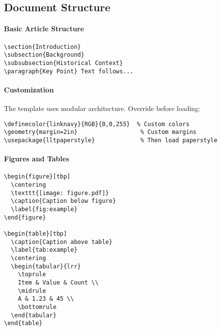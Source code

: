 \documentclass[11pt]{article}
\begin{document}
\subsection{Document Structure}

\paragraph{Basic Article Structure}
\begin{verbatim}
\section{Introduction}
\subsection{Background}
\subsubsection{Historical Context}
\paragraph{Key Point} Text follows...
\end{verbatim}

\paragraph{Customization} The template uses modular architecture. Override before loading:
\begin{verbatim}
\definecolor{linknavy}{RGB}{0,0,255}  % Custom colors
\geometry{margin=2in}                  % Custom margins  
\usepackage{lltpaperstyle}             % Then load paperstyle
\end{verbatim}

\paragraph{Figures and Tables}
\begin{verbatim}
\begin{figure}[tbp]
  \centering
  \texttt{[image: figure.pdf]}
  \caption{Caption below figure}
  \label{fig:example}
\end{figure}

\begin{table}[tbp]
  \caption{Caption above table}
  \label{tab:example}
  \centering
  \begin{tabular}{lrr}
    \toprule
    Item & Value & Count \\
    \midrule
    A & 1.23 & 45 \\
    \bottomrule
  \end{tabular}
\end{table}
\end{verbatim}
\end{document}

